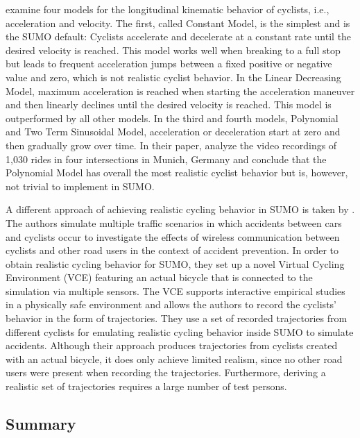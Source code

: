 \textcite{twaddle2016modeling} examine four models for the longitudinal kinematic behavior of cyclists, i.e., acceleration and velocity.
The first, called Constant Model, is the simplest and is the SUMO default:
Cyclists accelerate and decelerate at a constant rate until the desired velocity is reached.
This model works well when breaking to a full stop but leads to frequent acceleration jumps between a fixed positive or negative value and zero, which is not realistic cyclist behavior.
In the Linear Decreasing Model, maximum acceleration is reached when starting the acceleration maneuver and then linearly declines until the desired velocity is reached.
This model is outperformed by all other models.
In the third and fourth models, Polynomial and Two Term Sinusoidal Model, acceleration or deceleration start at zero and then gradually grow over time.
In their paper, \textcite{twaddle2016modeling} analyze the video recordings of 1,030 rides in four intersections in Munich, Germany and conclude that the Polynomial Model has overall the most realistic cyclist behavior but is, however, not trivial to implement in SUMO.

A different approach of achieving realistic cycling behavior in SUMO is taken by \textcite{heinovski2019modeling}.
The authors simulate multiple traffic scenarios in which accidents between cars and cyclists occur to investigate the effects of wireless communication between cyclists and other road users in the context of accident prevention.
In order to obtain realistic cycling behavior for SUMO, they set up a novel Virtual Cycling Environment (VCE) featuring an actual bicycle that is connected to the simulation via multiple sensors.
The VCE supports interactive empirical studies in a physically safe environment and allows the authors to record the cyclists' behavior in the form of trajectories.
They use a set of recorded trajectories from different cyclists for emulating realistic cycling behavior inside SUMO to simulate accidents.
Although their approach produces trajectories from cyclists created with an actual bicycle, it does only achieve limited realism, since no other road users were present when recording the trajectories.
Furthermore, deriving a realistic set of trajectories requires a large number of test persons.


\subsection{Summary}
\label{subsec:summary_sumo}


